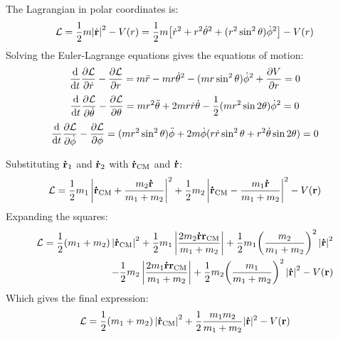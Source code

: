 \documentclass{report}
\theoremstyle{definition}
\begin{document}
\begin{chapter2}\label{prob: 3}
	The Lagrangian in polar coordinates is:
		\begin{gather*}
			\mathcal{L} = \frac{1}{2}m \abs{\dot {\bf r}}^2 - V(r) = \frac{1}{2}m \bqty{\dot r^2 + r^2\dot\theta^2 + (r^2\sin^2\theta)\dot\phi^2} - V(r)  
		\end{gather*}
		Solving the Euler-Lagrange equations gives the equations of motion:
		\begin{gather*}
			\dv{t}\pdv{\mathcal{L}}{\dot r} - \pdv{\mathcal{L}}{r} = m\ddot r - mr\dot\theta^2 - (mr\sin^2\theta)\dot\phi^2 + \pdv{V}{r} = 0
		\end{gather*}
		\begin{gather*}
			\dv{t}\pdv{\mathcal{L}}{\dot \theta} - \pdv{\mathcal{L}}{\theta} = mr^2\ddot\theta + 2mr\dot r \dot\theta - \frac{1}{2}(mr^2\sin 2\theta)\dot\phi^2 = 0
		\end{gather*}
		\begin{gather*}
			\dv{t}\pdv{\mathcal{L}}{\dot \phi} - \pdv{\mathcal{L}}{\phi}
			= (mr^2\sin^2\theta)\ddot\phi + 2m\dot\phi(r\dot r \sin^2\theta + r^2\dot\theta\sin 2\theta) = 0
			\end{gather*}
\end{chapter2}

\begin{chapter2}\label{prob: 4}
	Substituting ${\bf \dot r}_1$ and ${\bf \dot r}_2$ with ${\bf \dot r_{\mathrm{CM}}}$ and ${\bf \dot r}$:
	\begin{gather*}
		\mathcal{L} = \frac{1}{2}m_1\left|{\bf \dot r_{\mathrm{CM}}} + \frac{m_2{\bf \dot r}}{m_1 + m_2}\right|^2 + \frac{1}{2}m_2\left|{\bf \dot r_{\mathrm{CM}}} - \frac{m_1{\bf \dot r}}{m_1 + m_2}\right|^2 - V({\bf r})
	\end{gather*}
	Expanding the squares:
	\begin{align}
		\mathcal{L} = \frac{1}{2}(m_1 + m_2)\left|{\bf \dot r_{\mathrm{CM}}}\right|^2 + \frac{1}{2}m_1\left|\frac{2m_2{\bf \dot r r_{\mathrm{CM}}}}{m_1 + m_2}\right| + \frac{1}{2}m_1\pqty{\frac{m_2}{m_1 + m_2}}^2\left|{\bf \dot r}\right|^2 \notag\\ 
		- \frac{1}{2}m_2\left|\frac{2m_1{\bf \dot r r_{\mathrm{CM}}}}{m_1 + m_2}\right| + \frac{1}{2}m_2\pqty{\frac{m_1}{m_1 + m_2}}^2\left|{\bf \dot r}\right|^2 - V({\bf r}) 
	\end{align}
	Which gives the final expression:
	\begin{gather*}
		\mathcal{L} = \frac{1}{2}(m_1 + m_2)\left|{\bf \dot r_{\mathrm{CM}}}\right|^2 + \frac{1}{2}\frac{m_1 m_2}{m_1 + m_2}|{\bf \dot r}|^2 - V({\bf r})
	\end{gather*}
\end{chapter2}
\end{document}
